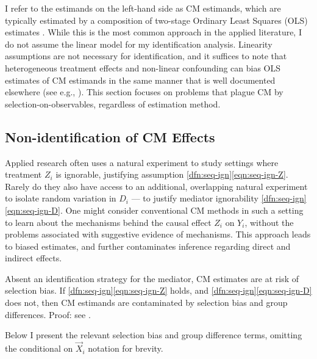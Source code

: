 
I refer to the estimands on the left-hand side as CM estimands, which are typically estimated by a composition of two-stage Ordinary Least Squares (OLS) estimates \citep{imai2010identification}.
While this is the most common approach in the applied literature, I do not assume the linear model for my identification analysis.
Linearity assumptions are not necessary for identification, and it suffices to note that heterogeneous treatment effects and non-linear confounding can bias OLS estimates of CM estimands in the same manner that is well documented elsewhere (see e.g., \citealt{angrist1998estimating,sloczynski2022interpreting}).
This section focuses on problems that plague CM by selection-on-observables, regardless of estimation method.

\subsection{Non-identification of CM Effects}
Applied research often uses a natural experiment to study settings where treatment $Z_i$ is ignorable, justifying assumption \ref{dfn:seq-ign}\eqref{eqn:seq-ign-Z}.
Rarely do they also have access to an additional, overlapping natural experiment to isolate random variation in $D_i$ --- to justify mediator ignorability \ref{dfn:seq-ign}\eqref{eqn:seq-ign-D}.
One might consider conventional CM methods in such a setting to learn about the mechanisms behind the causal effect $Z_i$ on $Y_i$, without the problems associated with suggestive evidence of mechanisms.
This approach leads to biased estimates, and further contaminates inference regarding direct and indirect effects.

\begin{theorem}
    \label{thm:selection-bias}
    Absent an identification strategy for the mediator, CM estimates are at risk of selection bias.
    If \ref{dfn:seq-ign}\eqref{eqn:seq-ign-Z} holds, and \ref{dfn:seq-ign}\eqref{eqn:seq-ign-D} does not, then CM estimands are contaminated by selection bias and group differences.
    Proof: see .
\end{theorem}
Below I present the relevant selection bias and group difference terms, omitting the conditional on $\vec X_i$ notation for brevity.

